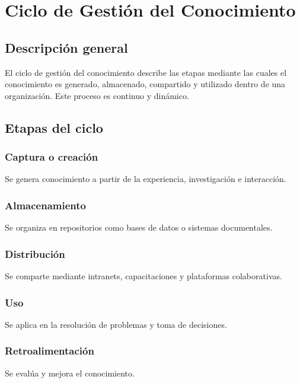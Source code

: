 \documentclass[12pt,a4paper]{article}
\begin{document}
\section{Ciclo de Gestión del Conocimiento}

\subsection{Descripción general}
El ciclo de gestión del conocimiento describe las etapas mediante las cuales el conocimiento es generado, almacenado, compartido y utilizado dentro de una organización. Este proceso es continuo y dinámico.

\subsection{Etapas del ciclo}

\subsubsection{Captura o creación}
Se genera conocimiento a partir de la experiencia, investigación e interacción.

\subsubsection{Almacenamiento}
Se organiza en repositorios como bases de datos o sistemas documentales.

\subsubsection{Distribución}
Se comparte mediante intranets, capacitaciones y plataformas colaborativas.

\subsubsection{Uso}
Se aplica en la resolución de problemas y toma de decisiones.

\subsubsection{Retroalimentación}
Se evalúa y mejora el conocimiento.
\end{document}
